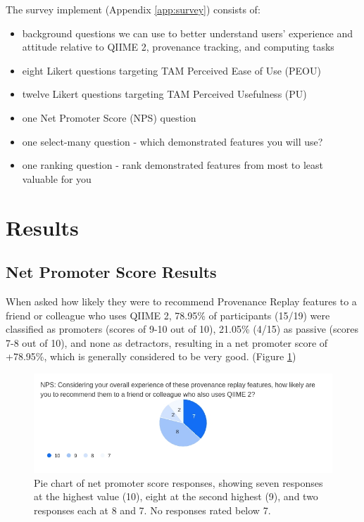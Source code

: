 The survey implement (Appendix \ref{app:survey}) consists of:
\begin{itemize}
    \item background questions we can use to better understand users’ experience and attitude relative to QIIME 2, provenance tracking, and computing tasks
    \item eight Likert questions targeting TAM Perceived Ease of Use (PEOU)
    \item twelve Likert questions targeting TAM Perceived Usefulness (PU)
    \item one Net Promoter Score (NPS) question
    \item one select-many question - which demonstrated features you will use?
    \item one ranking question - rank demonstrated features from most to least valuable for you
\end{itemize}

\section{Results}

\subsection{Net Promoter Score Results}

When asked how likely they were to recommend Provenance Replay features to a
friend or colleague who uses QIIME 2, 78.95\% of participants (15/19) were
classified as promoters (scores of 9-10 out of 10), 21.05\% (4/15) as passive
(scores 7-8 out of 10), and none as detractors, resulting in a net promoter
score of +78.95\%, which is generally considered to be very good. (Figure \ref{fig:NPS})

\begin{figure}[htbp]
\centering
\includegraphics[width=\textwidth]{figures/NPS.jpg}
\caption[Pie chart of net promoter score responses]%
{Pie chart of net promoter score responses, showing seven responses at the
highest value (10), eight at the second highest (9), and two responses each at 8
and 7. No responses rated below 7.}
\label{fig:NPS}
\end{figure}

